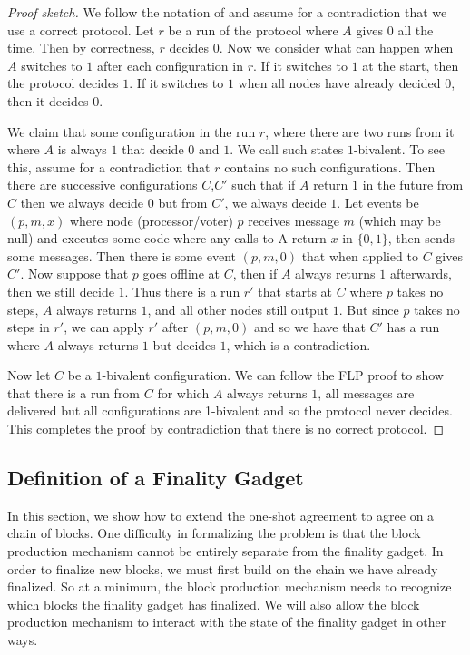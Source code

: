 \documentclass[a4paper,UKenglish,cleveref, autoref, thm-restate, anonymous]{lipics-v2019}
\begin{document}
\begin{proof}[Proof sketch] We follow the notation of  \cite{fischer85impossibility} and assume for a contradiction that we use a correct protocol. 
Let $r$ be a run of the protocol where $A$ gives $0$ all the time.
Then by correctness, $r$ decides $0$. Now we consider what can happen when $A$ switches to $1$ after each configuration in $r$. If it switches to $1$ at the start, then the protocol decides $1$.
If it switches to $1$ when all nodes have already decided $0$, then it decides $0$.

We claim that some configuration in the run $r$, where there are two runs from it where $A$ is always $1$ that decide $0$ and $1$. We call such states $1$-bivalent.
To see this, assume for a contradiction that $r$ contains no such configurations. Then there are successive configurations $C$,$C'$ such that if $A$ return $1$ in the future from $C$ then we always decide $0$ but from $C'$, we always decide $1$.
Let events be $(p,m,x)$ where node (processor/voter) $p$ receives message $m$ (which may be null) and executes some code where any calls to A return $x$ in $\{0,1\}$, then sends some messages. 
Then there is some event $(p,m,0)$ that when applied to $C$ gives $C'$. Now suppose that $p$ goes offline at $C$, then if $A$ always returns $1$ afterwards, then we still decide $1$. Thus there is a run $r'$ that starts at $C$ where $p$ takes no steps, $A$ always returns $1$, and all other nodes still output $1$.
But since $p$ takes no steps in $r'$, we can apply $r'$ after $(p, m, 0)$ and so we have that $C'$ has a run where $A$ always returns $1$ but decides $1$, which is a contradiction.

Now let $C$ be a $1$-bivalent configuration. We can follow the FLP proof to show that there is a run from $C$ for which $A$ always returns $1$, all messages are delivered but all configurations are 1-bivalent and so the protocol never decides. This completes the proof by contradiction that there is no correct protocol.
\end{proof}



\subsection{Definition of a Finality Gadget}

In this section, we show how to extend the one-shot agreement to agree on a chain of blocks. One difficulty in formalizing the problem is that the block production mechanism cannot be entirely separate from the finality gadget. In order to finalize new blocks, we must first build on the chain we have already finalized. So at a minimum, the block production mechanism needs to recognize which blocks the finality gadget has finalized. We will also allow the block production mechanism to interact with the state of the finality gadget in other ways.
\end{document}
